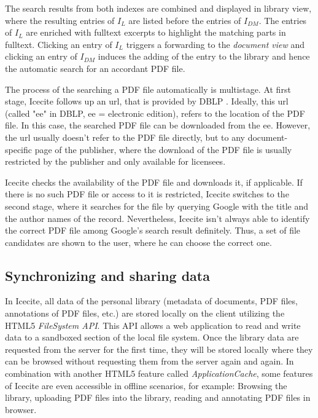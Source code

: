 The search results from both indexes are combined and displayed in library view, where the resulting entries of $I_L$ are listed before the entries of $I_{DM}$. The entries of $I_L$ are enriched with fulltext excerpts to highlight the matching parts in fulltext. Clicking an entry of $I_L$ triggers a forwarding to the \textit{document view} and clicking an entry of $I_{DM}$ induces the adding of the entry to the library and hence the automatic search for an accordant PDF file.

The process of the searching a PDF file automatically is multistage. At first stage, Icecite follows up an url, that is provided by DBLP . Ideally, this url (called "ee" in DBLP, ee = electronic edition), refers to the location of the PDF file. In this case, the searched PDF file can be downloaded from the ee. However, the url usually doesn't refer to the PDF file directly, but to any document-specific page of the publisher, where the download of the PDF file is usually restricted by the publisher and only available for licensees.

Icecite checks the availability of the PDF file and downloads it, if applicable. If there is no such PDF file or access to it is restricted, Icecite switches to the second stage, where it searches for the file by querying Google with the title and the author names of the record. 
Nevertheless, Icecite isn't always able to identify the correct PDF file among Google's search result definitely. Thus, a set of file candidates are shown to the user, where he can choose the correct one.

\subsection{Synchronizing and sharing data} \label{sec:html5} \label{sec:sync}
In Icecite, all data of the personal library (metadata of documents, PDF files, annotations of PDF files, etc.) are stored locally on the client utilizing the HTML5 \textit{FileSystem API}. This API allows a web application to read and write data to a sandboxed section of the local file system. Once the library data are requested from the server for the first time, they will be stored locally where they can be browsed without requesting them from the server again and again. In combination with another HTML5 feature called \textit{ApplicationCache}, some features of Icecite are even accessible in offline scenarios, for example: Browsing the library, uploading PDF files into the library, reading and annotating PDF files in browser. 


